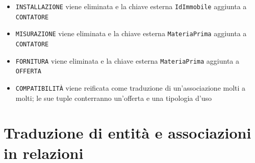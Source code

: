 \documentclass[a4paper,12pt]{report}
\begin{document}
\begin{itemize}
    \item \texttt{INSTALLAZIONE} viene eliminata e la chiave esterna \texttt{IdImmobile} aggiunta a \texttt{CONTATORE}
    \item \texttt{MISURAZIONE} viene eliminata e la chiave esterna \texttt{MateriaPrima} aggiunta a \texttt{CONTATORE}
    \item \texttt{FORNITURA} viene eliminata e la chiave esterna \texttt{MateriaPrima} aggiunta a \texttt{OFFERTA}
    \item \texttt{COMPATIBILITÀ} viene reificata come traduzione di un'associazione molti a molti; le sue tuple conterranno un'offerta e una tipologia d'uso
\end{itemize}

\section{Traduzione di entità e associazioni in relazioni}
\end{document}
